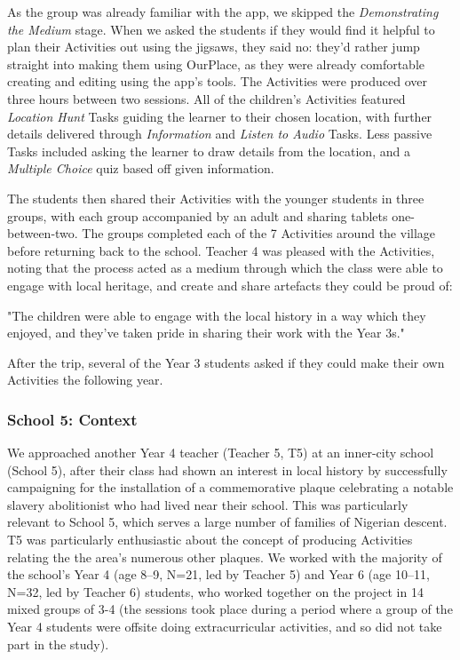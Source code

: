 As the group was already familiar with the app, we skipped the \textit{Demonstrating the Medium} stage. When we asked the students if they would find it helpful to plan their Activities out using the jigsaws, they said no: they'd rather jump straight into making them using OurPlace, as they were already comfortable creating and editing using the app's tools. The Activities were produced over three hours between two sessions. All of the children's Activities featured \textit{Location Hunt} Tasks guiding the learner to their chosen location, with further details delivered through \textit{Information} and \textit{Listen to Audio} Tasks. Less passive Tasks included asking the learner to draw details from the location, and a \textit{Multiple Choice} quiz based off given information. 

The students then shared their Activities with the younger students in three groups, with each group accompanied by an adult and sharing tablets one-between-two. The groups completed each of the 7 Activities around the village before returning back to the school. Teacher 4 was pleased with the Activities, noting that the process acted as a medium through which the class were able to engage with local heritage, and create and share artefacts they could be proud of:

\begin{displayquote}
"The children were able to engage with the local history in a way which they enjoyed, and they've taken pride in sharing their work with the Year 3s."
\end{displayquote}

After the trip, several of the Year 3 students asked if they could make their own Activities the following year.

\subsubsection{School 5: Context}
We approached another Year 4 teacher (Teacher 5, T5) at an inner-city school (School 5), after their class had shown an interest in local history by successfully campaigning for the installation of a commemorative plaque celebrating a notable slavery abolitionist who had lived near their school. This was particularly relevant to School 5, which serves a large number of families of Nigerian descent. T5 was particularly enthusiastic about the concept of producing Activities relating the the area's numerous other plaques. We worked with the majority of the school's Year 4 (age 8--9, N=21, led by Teacher 5) and Year 6 (age 10--11, N=32, led by Teacher 6) students, who worked together on the project in 14 mixed groups of 3-4 (the sessions took place during a period where a group of the Year 4 students were offsite doing extracurricular activities, and so did not take part in the study). 

